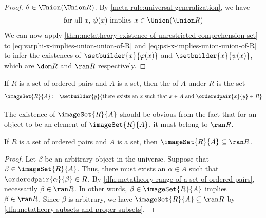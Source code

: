 \begin{proof}
    \( \theta \in \Union \mleft( \Union R \mright) \).
    By \cref{meta-rule:universal-generalization}, we have
    \begin{equation}
        \label{eq:psi-x-implies-union-union-of-R}
        \text{for all \( x \), \( \psi(x) \) implies \( x \in \Union \mleft( \Union R \mright) \)}
    \end{equation}
    We can now apply \cref{thm:metatheory-existence-of-unrestricted-comprehension-set} to \eqref{eq:varphi-x-implies-union-union-of-R} and
    \eqref{eq:psi-x-implies-union-union-of-R} to infer the existences of
    \( \setbuilder{x}{\varphi(x)} \) and \( \setbuilder{x}{\psi(x)} \), which are \( \dom R \) and \( \ran R \) respectively.
\end{proof}

\begin{dfn}[Image]
     \label{dfn:metatheory-image-of-a-set-under-a-set-of-ordered-pairs}
    If \( R \) is a set of ordered pairs and \( A \) is a set, then the  of \( A \) under \( R \)
    is the set
    \begin{equation*}
        \imageSet{R}{A} \coloneq \setbuilder{y}{\text{there exists an \( x \) such that \( x \in A \) and \( \orderedpair{x}{y} \in R \)}}
    \end{equation*}
\end{dfn}

\begin{rem}
    The existence of \( \imageSet{R}{A} \) should be obvious from the fact that for an object to be an element of \( \imageSet{R}{A} \), it must belong to \( \ran R \).
\end{rem}

\begin{thm}
     \label{thm:metatheory-image-of-a-set-under-a-set-of-ordered-pairs-is-the-subset-of-the-range-of-the-set-of-ordered-pairs}
    If \( R \) is a set of ordered pairs and \( A \) is a set, then \( \imageSet{R}{A} \subseteq \ran R \).
\end{thm}

\begin{proof}
    Let \( \beta \) be an arbitrary object in the universe.
    Suppose that \( \beta \in \imageSet{R}{A} \).
    Thus, there must exists an \( \alpha \in A \) such that \( \orderedpair{\alpha}{\beta} \in R \).
    By \cref{dfn:metatheory-range-of-a-set-of-ordered-pairs}, necessarily \( \beta \in \ran R \).
    In other words, \( \beta \in \imageSet{R}{A} \) implies \( \beta \in \ran R \).
    Since \( \beta \) is arbitrary, we have \( \imageSet{R}{A} \subseteq \ran R \) by \cref{dfn:metatheory-subsets-and-proper-subsets}.
\end{proof}

